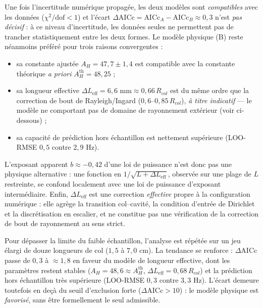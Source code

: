 \documentclass[11pt,a4paper,twocolumn]{article}
\begin{document}
Une fois l'incertitude numérique propagée, les deux modèles sont \emph{compatibles} avec les données ($\chi^2/\mathrm{dof} < 1$) et l'écart $\Delta\text{AICc} = \text{AICc}_A - \text{AICc}_B \approx 0{,}3$ n'est \emph{pas décisif} : à ce niveau d'incertitude, les données seules ne permettent pas de trancher statistiquement entre les deux formes. Le modèle physique (B) reste néanmoins préféré pour trois raisons convergentes :
\begin{itemize}
    \item sa constante ajustée $A_H = 47{,}7 \pm 1{,}4$ est compatible avec la constante théorique \emph{a priori} $A_H^{\mathrm{th}} = 48{,}25$ ;
    \item sa longueur effective $\Delta L_{\mathrm{eff}} = 6{,}6\text{ mm} \approx 0{,}66\,R_{col}$ est du même ordre que la correction de bout de Rayleigh/Ingard \cite{ingard1953theory} ($0{,}6$–$0{,}85\,R_{col}$), \emph{à titre indicatif} — le modèle ne comportant pas de domaine de rayonnement extérieur (voir ci-dessous) ;
    \item sa capacité de prédiction hors échantillon est nettement supérieure (LOO-RMSE $0{,}5$ contre $2{,}9$ Hz).
\end{itemize}

L'exposant apparent $b \approx -0{,}42$ d'une loi de puissance n'est donc pas une physique alternative : une fonction en $1/\sqrt{L+\Delta L_{\mathrm{eff}}}$, observée sur une plage de $L$ restreinte, se confond localement avec une loi de puissance d'exposant intermédiaire. Enfin, $\Delta L_{\mathrm{eff}}$ est une correction \emph{effective} propre à la configuration numérique : elle agrège la transition col–cavité, la condition d'entrée de Dirichlet et la discrétisation en escalier, et ne constitue pas une vérification de la correction de bout de rayonnement au sens strict.

Pour dépasser la limite du faible échantillon, l'analyse est répétée sur un jeu élargi de douze longueurs de col ($1{,}5$ à $7{,}0$ cm). La tendance se renforce : $\Delta\text{AICc}$ passe de $0{,}3$ à $\approx 1{,}8$ en faveur du modèle de longueur effective, dont les paramètres restent stables ($A_H = 48{,}6 \approx A_H^{\mathrm{th}}$, $\Delta L_{\mathrm{eff}} = 0{,}68\,R_{col}$) et la prédiction hors échantillon très supérieure (LOO-RMSE $0{,}3$ contre $3{,}3$ Hz). L'écart demeure toutefois en deçà du seuil d'exclusion forte ($\Delta\text{AICc}>10$) : le modèle physique est \emph{favorisé}, sans être formellement le seul admissible.
\end{document}
